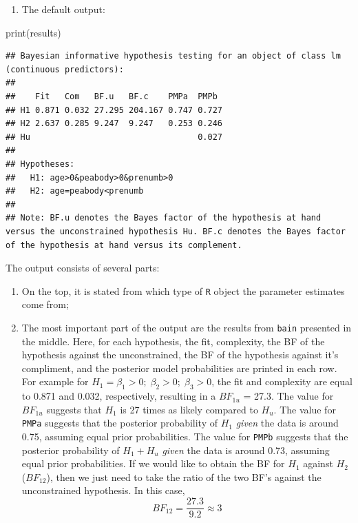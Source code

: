 \documentclass[
]{book}
\newenvironment{Shaded}{\begin{snugshade}}{\end{snugshade}}
\newcommand{\FunctionTok}[1]{\textcolor[rgb]{0.00,0.00,0.00}{#1}}
\newcommand{\NormalTok}[1]{#1}
\providecommand{\tightlist}{%
  \setlength{\itemsep}{0pt}\setlength{\parskip}{0pt}}
\begin{document}
\begin{enumerate}
\def\labelenumi{(\arabic{enumi})}
\tightlist
\item
  The default output:
\end{enumerate}

\begin{Shaded}
\begin{Highlighting}[]
\FunctionTok{print}\NormalTok{(results)}
\end{Highlighting}
\end{Shaded}

\begin{verbatim}
## Bayesian informative hypothesis testing for an object of class lm (continuous predictors):
## 
##    Fit   Com   BF.u   BF.c    PMPa  PMPb 
## H1 0.871 0.032 27.295 204.167 0.747 0.727
## H2 2.637 0.285 9.247  9.247   0.253 0.246
## Hu                                  0.027
## 
## Hypotheses:
##   H1: age>0&peabody>0&prenumb>0
##   H2: age=peabody<prenumb
## 
## Note: BF.u denotes the Bayes factor of the hypothesis at hand versus the unconstrained hypothesis Hu. BF.c denotes the Bayes factor of the hypothesis at hand versus its complement.
\end{verbatim}

The output consists of several parts:

\begin{enumerate}
\def\labelenumi{(\alph{enumi})}
\tightlist
\item
  On the top, it is stated from which type of \texttt{R} object the parameter estimates come from;
\item
  The most important part of the output are the results from \texttt{bain} presented in the middle. Here, for each hypothesis, the fit, complexity, the BF of the hypothesis against the unconstrained, the BF of the hypothesis against it's compliment, and the posterior model probabilities are printed in each row. For example for \(H_1 =\beta_1 > 0;\; \beta_2 > 0;\; \beta_3 >0\), the fit and complexity are equal to 0.871 and 0.032, respectively, resulting in a \(BF_{1u}\) = 27.3. The value for \(BF_{1u}\) suggests that \(H_1\) is 27 times as likely compared to \(H_u\). The value for \texttt{PMPa} suggests that the posterior probability of \(H_1\) \emph{given} the data is around 0.75, assuming equal prior probabilities. The value for \texttt{PMPb} suggests that the posterior probability of \(H_1 + H_u\) \emph{given} the data is around 0.73, assuming equal prior probabilities. If we would like to obtain the BF for \(H_1\) against \(H_2\) (\(BF_{12}\)), then we just need to take the ratio of the two BF's against the unconstrained hypothesis. In this case, \[BF_{12} = \frac{27.3}{9.2} \approx 3\]
\end{enumerate}
\end{document}
